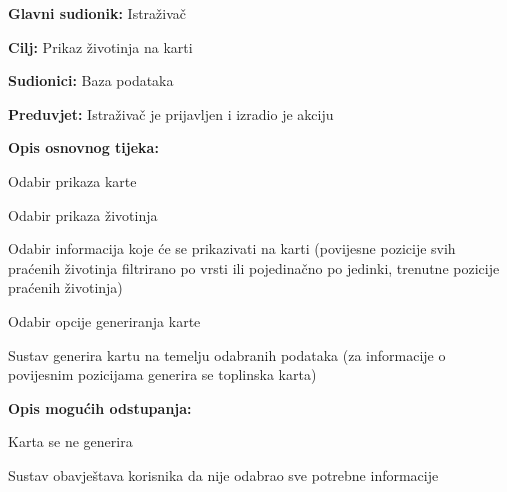 					\noindent {}
					\begin{packed_item}
						
						\item \textbf{Glavni sudionik: }Istraživač
						\item  \textbf{Cilj:} Prikaz životinja na karti
						\item  \textbf{Sudionici:} Baza podataka
						\item  \textbf{Preduvjet:} Istraživač je prijavljen i izradio je akciju
						\item  \textbf{Opis osnovnog tijeka:}
						
						\item[] \begin{packed_enum}
							
							\item Odabir prikaza karte
							\item Odabir prikaza životinja 
							
							\item Odabir informacija koje će se prikazivati na karti (povijesne pozicije svih praćenih životinja filtrirano po vrsti ili pojedinačno po jedinki, trenutne pozicije praćenih životinja)
							\item Odabir opcije generiranja karte
							\item Sustav generira kartu na temelju odabranih podataka (za informacije o povijesnim pozicijama generira se toplinska karta)
							
						\end{packed_enum}
						\item  \textbf{Opis mogućih odstupanja:}
						
						\item[] \begin{packed_item}
							
							\item[5.a]Karta se ne generira 
							\item[] \begin{packed_enum}
								
								\item Sustav obavještava korisnika da nije odabrao sve potrebne informacije
								
							\end{packed_enum}
							
						\end{packed_item}
					\end{packed_item}
						
